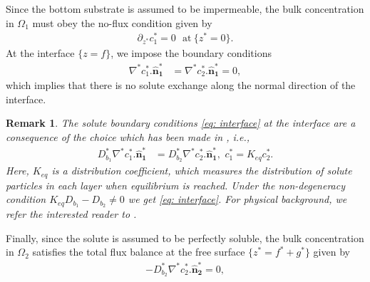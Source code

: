 \documentclass[11pt]{article}
\numberwithin{equation}{section}
\newtheorem{counter example}[theorem]{Counter Example}
\newtheorem{remark}[theorem] {Remark}
\begin{document}
{Since the bottom substrate is assumed to be impermeable, the bulk concentration in $\Omega_1$ must obey the no-flux condition given by
\begin{align}
\partial_{z^*} c_1^*=0~~~ \mathrm{at} ~\{z^*=0\}.
\end{align}
At the interface $\{z=f\}$, we impose the boundary conditions
\begin{align}\label{eq: interface}
     \nabla^* c_1^*.\mathbf{\hat{n}_1^*}&=\nabla^* c_2^*.\mathbf{\hat{n}_1^*}=0,
\end{align}
which implies that there is no solute exchange along the normal direction of the interface.
\begin{remark}\label{interfacial_remark}
The solute boundary conditions \eqref{eq: interface} at the interface are a consequence  of the choice which has been made in \cite{ kalogirou2019role, picardo2016solutal}, i.e.,
\begin{align*}
        D_{b_1}^* \nabla^* c_1^*.\mathbf{\hat{n}_1^*}&=D_{b_2}^* \nabla^* c_2^*.\mathbf{\hat{n}_1^*},
        \,\, c_1^*=K_{eq}c_2^*.\nonumber
\end{align*}
Here,  $K_{eq}$ is a distribution coefficient, which measures the distribution of solute particles in each layer when equilibrium is reached. Under the non-degeneracy condition $K_{eq}D_{b_1}-D_{b_2}\neq 0$ we get \eqref{eq: interface}.  For physical background, we refer the interested reader to  \cite{picardo2015modelling}. 
\end{remark}
Finally, since the solute is assumed to be perfectly soluble, the bulk concentration in $\Omega_2$ satisfies the total flux balance at the free surface $\{z^*=f^*+g^*\}$ given by 
\begin{align}\label{flux_free_surface}
-D_{b_2}^* \nabla^* c_2^*.\mathbf{\hat{n}_2^*}=0,
\end{align}

}
\end{document}
